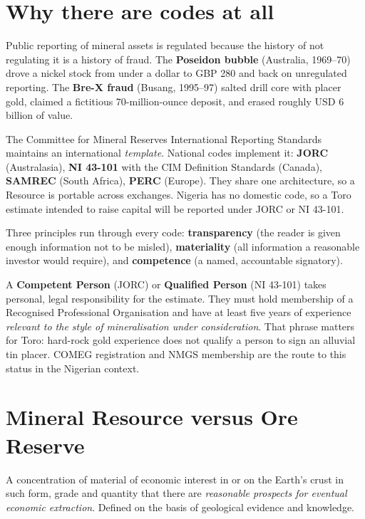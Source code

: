 \documentclass[11pt]{article}
\begin{document}
\section{Why there are codes at all}

Public reporting of mineral assets is regulated because the history of
not regulating it is a history of fraud. The \textbf{Poseidon bubble}
(Australia, 1969--70) drove a nickel stock from under a dollar to GBP 280
and back on unregulated reporting. The \textbf{Bre-X fraud} (Busang,
1995--97) salted drill core with placer gold, claimed a fictitious
70-million-ounce deposit, and erased roughly USD 6 billion of value.

\begin{defbox}
The Committee for Mineral Reserves International Reporting Standards
maintains an international \emph{template}. National codes implement it:
\textbf{JORC} (Australasia), \textbf{NI 43-101} with the CIM Definition
Standards (Canada), \textbf{SAMREC} (South Africa), \textbf{PERC}
(Europe). They share one architecture, so a Resource is portable across
exchanges. Nigeria has no domestic code, so a Toro estimate intended to
raise capital will be reported under JORC or NI 43-101.
\end{defbox}

Three principles run through every code: \textbf{transparency} (the
reader is given enough information not to be misled), \textbf{materiality}
(all information a reasonable investor would require), and
\textbf{competence} (a named, accountable signatory).

\begin{keybox}
A \textbf{Competent Person} (JORC) or \textbf{Qualified Person}
(NI 43-101) takes personal, legal responsibility for the estimate. They
must hold membership of a Recognised Professional Organisation and have
at least five years of experience \emph{relevant to the style of
mineralisation under consideration}. That phrase matters for Toro:
hard-rock gold experience does not qualify a person to sign an alluvial
tin placer. COMEG registration and NMGS membership are the route to this
status in the Nigerian context.
\end{keybox}

\section{Mineral Resource versus Ore Reserve}

\begin{defbox}
A concentration of material of economic interest in or on the Earth's
crust in such form, grade and quantity that there are \emph{reasonable
prospects for eventual economic extraction}. Defined on the basis of
geological evidence and knowledge.
\end{defbox}
\end{document}
